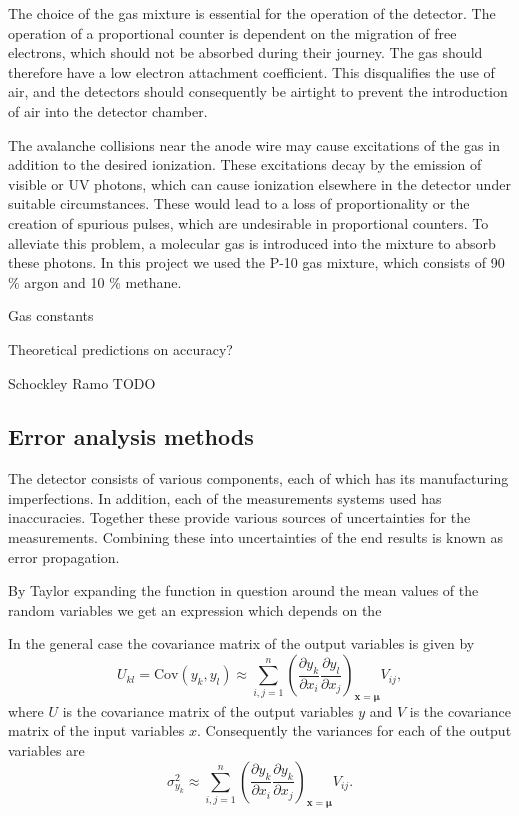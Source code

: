 \documentclass[a4paper]{article}
\begin{document}
The choice of the gas mixture is essential for the operation of the detector.
The operation of a proportional counter is dependent on the migration of free electrons, which should not be absorbed during their journey.
The gas should therefore have a low electron attachment coefficient.
This disqualifies the use of air, and the detectors should consequently be airtight to prevent the introduction of air into the detector chamber.
\cite[p. 167--168]{knoll_radiation_2010}

The avalanche collisions near the anode wire may cause excitations of the gas in addition to the desired ionization.
These excitations decay by the emission of visible or UV photons, which can cause ionization elsewhere in the detector under suitable circumstances.
These would lead to a loss of proportionality or the creation of spurious pulses, which are undesirable in proportional counters.
To alleviate this problem, a molecular gas is introduced into the mixture to absorb these photons.
In this project we used the P-10 gas mixture, which consists of 90 \% argon and 10 \% methane.
\cite[p. 168]{knoll_radiation_2010}


Gas constants \cite{wolff_measurement_1974}

Theoretical predictions on accuracy?

Schockley \cite{shockley_currents_1938}
Ramo \cite{ramo_currents_1939}
TODO


\subsection{Error analysis methods}
\label{error_analysis}
The detector consists of various components, each of which has its manufacturing imperfections.
In addition, each of the measurements systems used has inaccuracies.
Together these provide various sources of uncertainties for the measurements.
Combining these into uncertainties of the end results is known as error propagation.

By Taylor expanding the function in question around the mean values of the random variables we get an expression which depends on the 

In the general case the covariance matrix of the output variables is given by
\begin{equation}
U_{kl}
= \mathrm{Cov}(y_k, y_l)
\approx \sum_{i,j=1}^n \left( \frac{\partial y_k}{\partial x_i} \frac{\partial y_l}{\partial x_j} \right)_{\mathbf{x}=\mathbf{\mu}} V_{ij},
\end{equation}
where $U$ is the covariance matrix of the output variables $y$ and $V$ is the covariance matrix of the input variables $x$.
Consequently the variances for each of the output variables are
\begin{equation}
\sigma_{y_k}^2 \approx \sum_{i,j=1}^n \left( \frac{\partial y_k}{\partial x_i} \frac{\partial y_k}{\partial x_j} \right)_{\mathbf{x}=\mathbf{\mu}} V_{ij}.
\end{equation}
\cite[p. 20--22]{cowan_statistical_1998}
\end{document}
